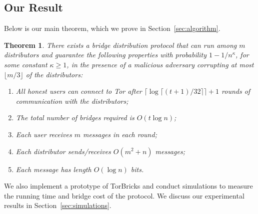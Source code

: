 \documentclass[USenglish,oneside,twocolumn]{article}
\newcommand{\todo}[1]{{\leavevmode\color{blue}[TODO: #1]}}
\newtheorem{theorem}{Theorem}
\newcommand{\bricks}{}
\def\bricks/{\textsf{\sfsize \mbox{TorBricks}}}
\newcommand{\sfsize}{\fontsize{0.68\baselineskip}{0.68\baselineskip}\selectfont}
\begin{document}
\subsection{Our Result} \label{sec:results}
\noindent Below is our main theorem, which we prove in Section~\ref{sec:algorithm}.
\begin{theorem}
	\label{thm:main} There exists a bridge distribution protocol that can run among $m$ distributors and guarantee the following properties with probability ${1 - 1/n^\kappa}$, for some constant ${\kappa \geq 1}$, in the presence of a malicious adversary corrupting at most $\lfloor m/3 \rfloor$ of the distributors: %
	\begin{enumerate}[itemsep=0.4em,topsep=0.5em]
		\item All honest users can connect to Tor after ${\lceil \log{\lceil (t+1)/32 \rceil} \rceil + 1}$ rounds of communication with the distributors;
		\item The total number of bridges required is $O(t\log{n})$;
		\item Each user receives $m$ messages in each round;
		\item Each distributor sends/receives $O(m^2 + n)$ messages;
		\item Each message has length $O(\log{n})$ bits.
	\end{enumerate}
\end{theorem}

We also implement a prototype of \bricks/ and conduct simulations to measure the running time and bridge cost of the protocol. We discuss our experimental results in Section~\ref{sec:simulations}.

\end{document}
